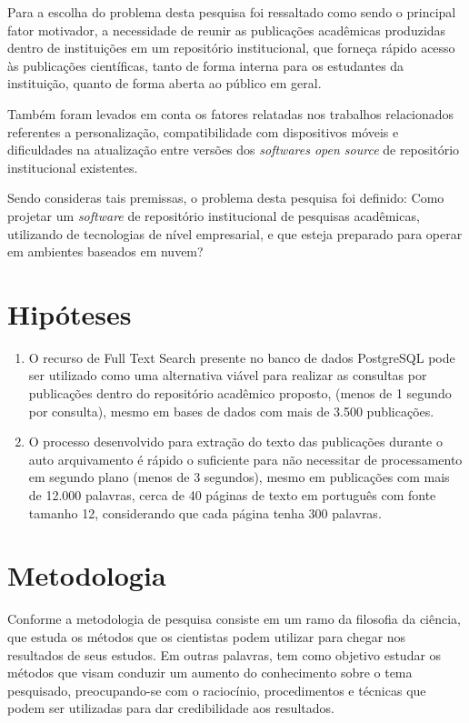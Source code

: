 Para a escolha do problema desta pesquisa foi ressaltado como sendo
o principal fator motivador, a necessidade de reunir as publicações acadêmicas
produzidas dentro de instituições em um repositório institucional,
que forneça rápido acesso às publicações científicas,
tanto de forma interna para os estudantes da instituição,
quanto de forma aberta ao público em geral.

Também foram levados em conta os fatores relatadas nos trabalhos
relacionados referentes a personalização, compatibilidade com
dispositivos móveis e dificuldades na atualização entre versões
dos \emph{softwares open source} de repositório institucional existentes.

Sendo consideras tais premissas, o problema desta pesquisa foi definido:
Como projetar um \emph{software} de repositório institucional de pesquisas
acadêmicas, utilizando de tecnologias de nível empresarial, e que esteja
preparado para operar em ambientes baseados em nuvem?

\section{Hipóteses} \label{sec::Hypothesis}

\begin{enumerate}
    \item O recurso de Full Text Search presente no banco de dados PostgreSQL
          pode ser utilizado como uma alternativa viável para realizar
          as consultas por publicações dentro do repositório acadêmico
          proposto, (menos de 1 segundo por consulta), mesmo em bases de
          dados com mais de 3.500 publicações.

    \item O processo desenvolvido para extração do texto das publicações
          durante o auto arquivamento é rápido o suficiente para não
          necessitar de processamento em segundo plano (menos de 3 segundos),
          mesmo em publicações com mais de 12.000 palavras, cerca de 40 páginas
          de texto em português com fonte tamanho 12, considerando que cada página tenha
          300 palavras.

\end{enumerate}

\section{Metodologia} \label{sec:Methodology}

Conforme \citep[p. 15]{LOVATO:metodologia} a metodologia de pesquisa
consiste em um ramo da filosofia da ciência, que estuda os métodos que
os cientistas podem utilizar para chegar nos resultados de seus estudos.
Em outras palavras, tem como objetivo estudar os métodos que visam
conduzir um aumento do conhecimento sobre o tema pesquisado, preocupando-se
com o raciocínio, procedimentos e técnicas que podem ser utilizadas para
dar credibilidade aos resultados.

